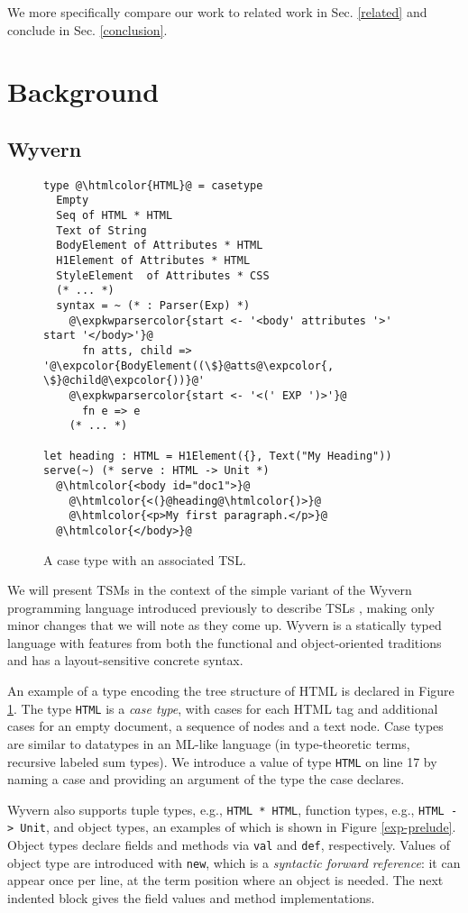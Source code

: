 \documentclass{sig-alternate}[10pt]
\newcommand{\lstinlinew}[1]{\lstinline[style=wyvern]{#1}}
\newcommand{\htmlcolor}[1]{\textcolor[HTML]{339933}{#1}}
\newcommand{\expkwparsercolor}[1]{\textcolor[HTML]{336699}{#1}}
\newcommand{\expcolor}[1]{\textcolor[HTML]{FF0033}{#1}}
\newcommand{\mycaption}[1]{\vspace{-10px}\caption{#1}\vspace{-10px}}
\begin{document}
We more specifically compare our work to related work in Sec. \ref{related} and conclude in Sec. \ref{conclusion}.

\section{Background}\label{background}
\subsection{Wyvern}

\begin{figure}[t!]
\begin{lstlisting}[style=wyvern]
type @\htmlcolor{HTML}@ = casetype 
  Empty
  Seq of HTML * HTML 
  Text of String
  BodyElement of Attributes * HTML
  H1Element of Attributes * HTML
  StyleElement  of Attributes * CSS
  (* ... *)
  syntax = ~ (* : Parser(Exp) *)
    @\expkwparsercolor{start <- '<body' attributes '>' start '</body>'}@
      fn atts, child => '@\expcolor{BodyElement((\$}@atts@\expcolor{, \$}@child@\expcolor{))}@'
    @\expkwparsercolor{start <- '<(' EXP ')>'}@
      fn e => e
    (* ... *)

let heading : HTML = H1Element({}, Text("My Heading"))
serve(~) (* serve : HTML -> Unit *)
  @\htmlcolor{<body id="doc1">}@
    @\htmlcolor{<(}@heading@\htmlcolor{)>}@
    @\htmlcolor{<p>My first paragraph.</p>}@
  @\htmlcolor{</body>}@
\end{lstlisting}
\mycaption{A case type with an associated TSL.}
\label{f-htmltype}
\end{figure}
We will present TSMs in the context of the simple variant of the Wyvern programming language introduced previously to describe TSLs  \cite{TSLs}, making only minor changes that we will note as they come up. Wyvern is a statically typed  language with features from both the functional and object-oriented traditions and has a layout-sensitive concrete syntax. 

An example of a type encoding the tree structure of HTML is declared in Figure \ref{f-htmltype}. The type \lstinlinew{HTML} is a \emph{case type}, with cases for each HTML tag and additional cases for an empty document, a sequence of nodes and a text node. Case types are similar to datatypes in an ML-like language (in type-theoretic terms, recursive labeled sum types). 
We introduce a value of type \lstinlinew{HTML} on line 17 by naming a case and providing an argument of the type the case declares.

Wyvern also supports tuple types, e.g., \lstinlinew{HTML * HTML}, function types, e.g., \lstinlinew{HTML -> Unit}, and object types, an examples of which is shown in Figure \ref{exp-prelude}. Object types declare fields and methods via \texttt{val} and \texttt{def}, respectively. Values of object type are introduced with \lstinlinew{new}, which  is a  \emph{syntactic forward reference}: it can appear once per line, at the term position where an object is needed. The next indented block gives the field values and method implementations. %
\end{document}
